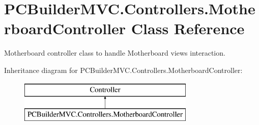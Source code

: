 \hypertarget{class_p_c_builder_m_v_c_1_1_controllers_1_1_motherboard_controller}{}\section{P\+C\+Builder\+M\+V\+C.\+Controllers.\+Motherboard\+Controller Class Reference}
\label{class_p_c_builder_m_v_c_1_1_controllers_1_1_motherboard_controller}


Motherboard controller class to handle Motherboard views interaction.  


Inheritance diagram for P\+C\+Builder\+M\+V\+C.\+Controllers.\+Motherboard\+Controller\+:\begin{figure}[H]
\begin{center}
\leavevmode
\includegraphics[height=2.000000cm]{class_p_c_builder_m_v_c_1_1_controllers_1_1_motherboard_controller}
\end{center}
\end{figure}
